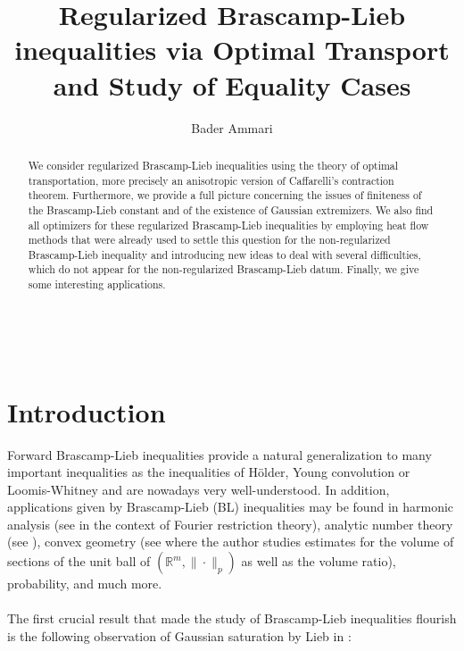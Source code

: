 \documentclass[11pt,a4paper,reqno]{amsart}
\numberwithin{equation}{section}
\theoremstyle{definition}
\newcommand{\<}{\ensuremath \leq}
\renewcommand{\>}{\ensuremath \geq}
\begin{document}
\title[]{Regularized Brascamp-Lieb inequalities via Optimal Transport and Study of Equality Cases}
\author[B. Ammari]{Bader Ammari}
\address[]{Department of Mathematics, ETH Z\"{u}rich, R\"{a}mistrasse 101, CH-8092 Z\"{u}rich, Switzerland}

\large
\maketitle



\begin{abstract}
    We consider regularized Brascamp-Lieb inequalities using the theory of optimal transportation, more precisely an anisotropic version of Caffarelli's contraction theorem. Furthermore, we provide a full picture concerning the issues of finiteness of the Brascamp-Lieb constant and of the existence of Gaussian extremizers. We also find all optimizers for these regularized Brascamp-Lieb inequalities by employing heat flow methods that were already used to settle this question for the non-regularized Brascamp-Lieb inequality and introducing new ideas to deal with several difficulties, which do not appear for the non-regularized Brascamp-Lieb datum. Finally, we give some interesting applications.
\end{abstract}

\hfill \\


\vspace{0.2cm}
{\small
{} }


\vspace{0.2cm}
{\small
{}}
\vspace{0.5cm}



\section{Introduction}



Forward Brascamp-Lieb inequalities provide a natural generalization to many important inequalities as the inequalities of Hölder, Young convolution or Loomis-Whitney and are nowadays very well-understood. In addition, applications given by Brascamp-Lieb (BL) inequalities may be found in harmonic analysis (see \cite{BCT} in the context of Fourier restriction theory), analytic number theory (see \cite{Guo_Zhang}), convex geometry (see \cite{KBall,KBall2} where the author studies estimates for the volume of sections of the unit ball of $(\mathbb{R}^m,\|\cdot\|_p)$ as well as the volume ratio), probability, and much more. 
\hfill \\ \\ The first crucial result that made the study of Brascamp-Lieb inequalities flourish is the following observation of Gaussian saturation by Lieb in \cite{Lieb}: 
\end{document}
